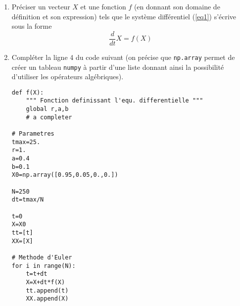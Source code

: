 \begin{enumerate}
\item Pr\'eciser un vecteur $X$ et une fonction $f$ (en donnant son domaine de d\'efinition et son expression) tels que le syst\`eme diff\'erentiel (\ref{eq1}) s'\'ecrive sous la forme
$$
\frac{d}{dt}X = f(X)
$$ 
\item Compl\'eter la ligne 4 du code suivant (on pr\'ecise que \texttt{np.array} permet de cr\'eer un tableau \texttt{numpy} \`a partir d'une liste donnant ainsi la possibilit\'e d'utiliser les op\'erateurs alg\'ebriques).
\begin{lstlisting}
def f(X):
	""" Fonction definissant l'equ. differentielle """
	global r,a,b
	# a completer
	
# Parametres
tmax=25.
r=1.
a=0.4
b=0.1
X0=np.array([0.95,0.05,0.,0.])

N=250
dt=tmax/N

t=0
X=X0
tt=[t]
XX=[X]

# Methode d'Euler
for i in range(N):
	t=t+dt
	X=X+dt*f(X)
	tt.append(t)
	XX.append(X)
\end{lstlisting}


\end{enumerate}
